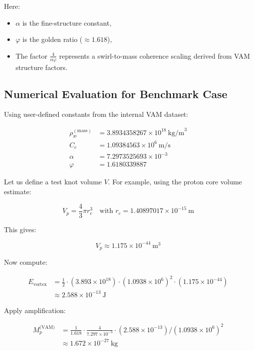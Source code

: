 \documentclass[twocolumn,aps,pre,floatfix,nofootinbib]{revtex4-2}
\begin{document}
Here:
\begin{itemize}
\item \( \alpha \) is the fine-structure constant,
\item \( \varphi \) is the golden ratio (\( \approx 1.618 \)),
\item The factor \( \frac{4}{\alpha \varphi} \) represents a swirl-to-mass coherence scaling derived from VAM structure factors.
\end{itemize}

\subsection{Numerical Evaluation for Benchmark Case}

Using user-defined constants from the internal VAM dataset:

\begin{align*}
\rho_\text{\ae}^{(\text{mass})} &= 3.8934358267 \times 10^{18} \ \text{kg/m}^3 \\
C_e &= 1.09384563 \times 10^6 \ \text{m/s} \\
\alpha &= 7.2973525693 \times 10^{-3} \\
\varphi &= 1.6180339887
\end{align*}

Let us define a test knot volume \( V \). For example, using the proton core volume estimate:

\[
V_p = \frac{4}{3} \pi r_c^3 \quad \text{with } r_c = 1.40897017 \times 10^{-15} \ \text{m}
\]

This gives:

\[
V_p \approx 1.175 \times 10^{-44} \ \text{m}^3
\]

Now compute:

\begin{align*}
E_{\text{vortex}} &= \frac{1}{2} \cdot (3.893 \times 10^{18}) \cdot (1.0938 \times 10^6)^2 \cdot (1.175 \times 10^{-44}) \\
&\approx 2.588 \times 10^{-13} \ \text{J}
\end{align*}

Apply amplification:

\begin{align*}
M_p^{\text{(VAM)}} &= \frac{1}{1.618} \cdot \frac{4}{7.297 \times 10^{-3}} \cdot \left( 2.588 \times 10^{-13} \right) / (1.0938 \times 10^6)^2 \\
&\approx 1.672 \times 10^{-27} \ \text{kg}
\end{align*}
\end{document}
